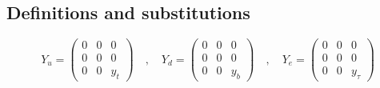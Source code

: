 \documentclass[12pt]{article}
\begin{document}
\subsection{Definitions and substitutions}
\begin{equation*}
Y_u=\begin{pmatrix}0 & 0 & 0\\0 & 0 & 0\\0 & 0 & y_t\end{pmatrix} \quad,\quad Y_d=\begin{pmatrix}0 & 0 & 0\\0 & 0 & 0\\0 & 0 & y_b\end{pmatrix} \quad,\quad Y_e=\begin{pmatrix}0 & 0 & 0\\0 & 0 & 0\\0 & 0 & y_\tau\end{pmatrix}
\end{equation*}
\end{document}
